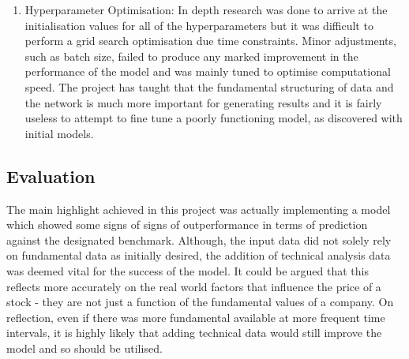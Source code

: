 \documentclass[10pt,onecolumn,letterpaper]{article}
\begin{document}
\begin{enumerate}
	\item Hyperparameter Optimisation: In depth research was done to arrive at the initialisation values for all of the hyperparameters but it was difficult to perform a grid search optimisation due time constraints. Minor adjustments, such as batch size, failed to produce any marked improvement in the performance of the model and was mainly tuned to optimise computational speed. The project has taught that the fundamental structuring of data and the network is much more important for generating results and it is fairly useless to attempt to fine tune a poorly functioning model, as discovered with initial models.  
\end{enumerate}

\subsection{Evaluation} \label{evaluation}

The main highlight achieved in this project was actually implementing a model which showed some signs of signs of outperformance in terms of prediction against the designated benchmark. Although, the input data did not solely rely on fundamental data as initially desired, the addition of technical analysis data was deemed vital for the success of the model. It could be argued that this reflects more accurately on the real world factors that influence the price of a stock - they are not just a function of the fundamental values of a company. On reflection, even if there was more fundamental available at more frequent time intervals, it is highly likely that adding technical data would still improve the model and so should be utilised.
\end{document}
